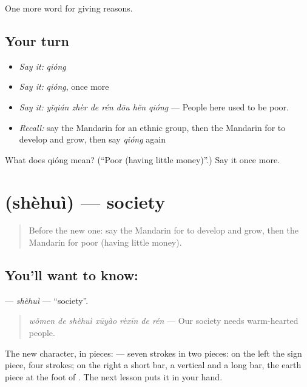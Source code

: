 \begin{grammarlens}[title={What you've built}]
One more word for giving reasons.
\end{grammarlens}

\subsection*{Your turn}
\begin{itemize}
\raggedright
  \item \emph{Say it:} \emph{qióng}
  \item \emph{Say it:} \emph{qióng}, once more
  \item \emph{Say it:} \emph{yǐqián zhèr de rén dōu hěn qióng} — People here used to be poor.
  \item \emph{Recall:} say the Mandarin for an ethnic group, then the Mandarin for to develop and grow, then say \emph{qióng} again
\end{itemize}

\begin{tcolorbox}[breakable,colback=teal!4,colframe=teal!35!black,title={Before you move on}]
What does qióng mean? (\textquotedblleft{}Poor (having little money)\textquotedblright{}.) Say it once more.
\end{tcolorbox}
\section[\texorpdfstring{\zh{社会} (shèhuì)}{社会 (shèhuì)}]{ (shèhuì) — society}

\label{lesson:ZH-C375-shehui}



\begin{quote}
Before the new one: say the Mandarin for to develop and grow, then the Mandarin for poor (having little money).
\end{quote}

\subsection*{You'll want to know: }
\textbf{} — \emph{shèhuì} — \textquotedblleft{}society\textquotedblright{}.

\begin{quote}
\emph{wǒmen de shèhuì xūyào rèxīn de rén} — Our society needs warm-hearted people.
\end{quote}

The new character, in pieces:  — seven strokes in two pieces: on the left the sign piece, four strokes; on the right a short bar, a vertical and a long bar, the earth piece at the foot of . The next lesson puts it in your hand.

